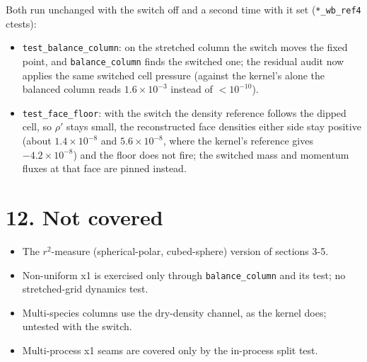 \documentclass[11pt,a4paper]{article}
\begin{document}
Both run unchanged with the switch off and a second time with it set (\texttt{*\_wb\_ref4} ctests):

\begin{itemize}
\item \texttt{test\_balance\_column}: on the stretched column the switch moves the fixed point, and \texttt{balance\_column} finds
  the switched one; the residual audit now applies the same switched cell pressure (against the kernel's
  alone the balanced column reads $1.6\times10^{-3}$ instead of $< 10^{-10}$).
\item \texttt{test\_face\_floor}: with the switch the density reference follows the dipped cell, so $\rho'$ stays small,
  the reconstructed face densities either side stay positive (about $1.4\times10^{-8}$ and $5.6\times10^{-8}$,
  where the kernel's reference gives $-4.2\times10^{-8}$) and the floor does not fire; the switched mass and
  momentum fluxes at that face are pinned instead.
\end{itemize}

\section*{12. Not covered}

\begin{itemize}
\item The $r^2$-measure (spherical-polar, cubed-sphere) version of sections 3-5.
\item Non-uniform x1 is exercised only through \texttt{balance\_column} and its test; no stretched-grid dynamics test.
\item Multi-species columns use the dry-density channel, as the kernel does; untested with the switch.
\item Multi-process x1 seams are covered only by the in-process split test.
\end{itemize}
\end{document}
